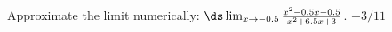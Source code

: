 {Approximate  the limit numerically: 
$\ds \lim_{x\to -0.5} \frac{x^2-0.5 x-0.5}{x^2+6.5 x+3}$.
}
{$-3/11$
}


